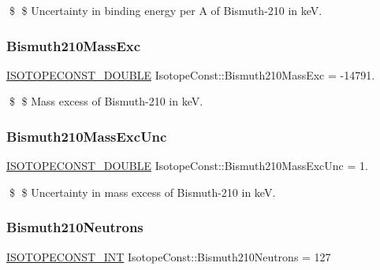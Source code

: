 \$ \$ Uncertainty in binding energy per A of Bismuth-\/210 in keV. \mbox{\label{group___isotope_const-_bismuth-_bi210_ga3b7d1bb879ed2f0ae2c29d58f079119d}} 
\subsubsection{\texorpdfstring{Bismuth210\+Mass\+Exc}{Bismuth210MassExc}}
{\footnotesize\ttfamily \mbox{\hyperlink{group___isotope_const-_macros_ga8f45a7272ce02c0b4c65c44636ed719a}{I\+S\+O\+T\+O\+P\+E\+C\+O\+N\+S\+T\+\_\+\+D\+O\+U\+B\+LE}} Isotope\+Const\+::\+Bismuth210\+Mass\+Exc = -\/14791.}

\$ \$ Mass excess of Bismuth-\/210 in keV. \mbox{\label{group___isotope_const-_bismuth-_bi210_ga482a419e5bd063caf5eefabc0a7b4714}} 
\subsubsection{\texorpdfstring{Bismuth210\+Mass\+Exc\+Unc}{Bismuth210MassExcUnc}}
{\footnotesize\ttfamily \mbox{\hyperlink{group___isotope_const-_macros_ga8f45a7272ce02c0b4c65c44636ed719a}{I\+S\+O\+T\+O\+P\+E\+C\+O\+N\+S\+T\+\_\+\+D\+O\+U\+B\+LE}} Isotope\+Const\+::\+Bismuth210\+Mass\+Exc\+Unc = 1.}

\$ \$ Uncertainty in mass excess of Bismuth-\/210 in keV. \mbox{\label{group___isotope_const-_bismuth-_bi210_gaf5e23034ac78dc39408f66f931723523}} 
\subsubsection{\texorpdfstring{Bismuth210\+Neutrons}{Bismuth210Neutrons}}
{\footnotesize\ttfamily \mbox{\hyperlink{group___isotope_const-_macros_ga5f18360b3e99483a35c32d789e62621c}{I\+S\+O\+T\+O\+P\+E\+C\+O\+N\+S\+T\+\_\+\+I\+NT}} Isotope\+Const\+::\+Bismuth210\+Neutrons = 127}


